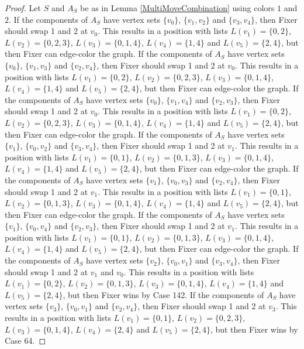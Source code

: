 \documentclass[12pt]{amsart}
\theoremstyle{plain}
\theoremstyle{definition}
\theoremstyle{remark}
\begin{document}
\begin{proof}
Let $S$ and $A_S$ be as in Lemma \ref{MultiMoveCombination} using colors $1$ and $2$. If the components of $A_S$ have vertex sets $\{v_0\}$, $\{v_1, v_2\}$ and $\{v_3, v_4\}$, then Fixer should swap 1 and 2 at $v_0$. This results in a position with lists $L(v_1) = \{0, 2\}$, $L(v_2) = \{0, 2, 3\}$, $L(v_3) = \{0, 1, 4\}$, $L(v_4) = \{1, 4\}$ and $L(v_5) = \{2, 4\}$, but then Fixer can edge-color the graph.
If the components of $A_S$ have vertex sets $\{v_0\}$, $\{v_1, v_3\}$ and $\{v_2, v_4\}$, then Fixer should swap 1 and 2 at $v_0$. This results in a position with lists $L(v_1) = \{0, 2\}$, $L(v_2) = \{0, 2, 3\}$, $L(v_3) = \{0, 1, 4\}$, $L(v_4) = \{1, 4\}$ and $L(v_5) = \{2, 4\}$, but then Fixer can edge-color the graph.
If the components of $A_S$ have vertex sets $\{v_0\}$, $\{v_1, v_4\}$ and $\{v_2, v_3\}$, then Fixer should swap 1 and 2 at $v_0$. This results in a position with lists $L(v_1) = \{0, 2\}$, $L(v_2) = \{0, 2, 3\}$, $L(v_3) = \{0, 1, 4\}$, $L(v_4) = \{1, 4\}$ and $L(v_5) = \{2, 4\}$, but then Fixer can edge-color the graph.
If the components of $A_S$ have vertex sets $\{v_1\}$, $\{v_0, v_2\}$ and $\{v_3, v_4\}$, then Fixer should swap 1 and 2 at $v_1$. This results in a position with lists $L(v_1) = \{0, 1\}$, $L(v_2) = \{0, 1, 3\}$, $L(v_3) = \{0, 1, 4\}$, $L(v_4) = \{1, 4\}$ and $L(v_5) = \{2, 4\}$, but then Fixer can edge-color the graph.
If the components of $A_S$ have vertex sets $\{v_1\}$, $\{v_0, v_3\}$ and $\{v_2, v_4\}$, then Fixer should swap 1 and 2 at $v_1$. This results in a position with lists $L(v_1) = \{0, 1\}$, $L(v_2) = \{0, 1, 3\}$, $L(v_3) = \{0, 1, 4\}$, $L(v_4) = \{1, 4\}$ and $L(v_5) = \{2, 4\}$, but then Fixer can edge-color the graph.
If the components of $A_S$ have vertex sets $\{v_1\}$, $\{v_0, v_4\}$ and $\{v_2, v_3\}$, then Fixer should swap 1 and 2 at $v_1$. This results in a position with lists $L(v_1) = \{0, 1\}$, $L(v_2) = \{0, 1, 3\}$, $L(v_3) = \{0, 1, 4\}$, $L(v_4) = \{1, 4\}$ and $L(v_5) = \{2, 4\}$, but then Fixer can edge-color the graph.
If the components of $A_S$ have vertex sets $\{v_2\}$, $\{v_0, v_1\}$ and $\{v_3, v_4\}$, then Fixer should swap 1 and 2 at $v_1$ and $v_0$. This results in a position with lists $L(v_1) = \{0, 2\}$, $L(v_2) = \{0, 1, 3\}$, $L(v_3) = \{0, 1, 4\}$, $L(v_4) = \{1, 4\}$ and $L(v_5) = \{2, 4\}$, but then Fixer wins by Case 142.
If the components of $A_S$ have vertex sets $\{v_3\}$, $\{v_0, v_1\}$ and $\{v_2, v_4\}$, then Fixer should swap 1 and 2 at $v_3$. This results in a position with lists $L(v_1) = \{0, 1\}$, $L(v_2) = \{0, 2, 3\}$, $L(v_3) = \{0, 1, 4\}$, $L(v_4) = \{2, 4\}$ and $L(v_5) = \{2, 4\}$, but then Fixer wins by Case 64.

\end{proof}
\end{document}
